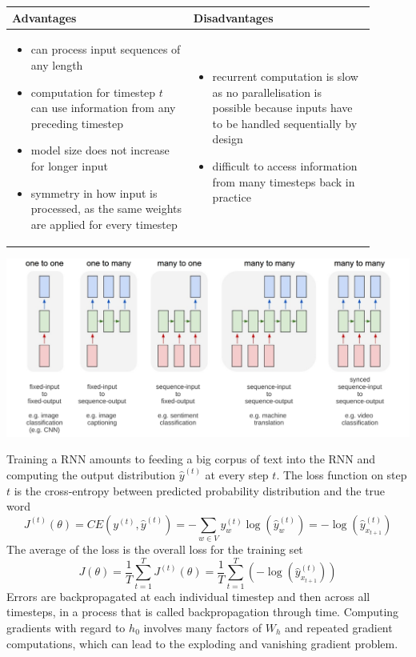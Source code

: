 \documentclass[11pt]{article}
\begin{document}
\begin{tabularx}{\linewidth}{p{0.45\linewidth} p{0.45\linewidth}}
	{\color{Green3} \textbf{Advantages}} & {\color{Firebrick3} \textbf{Disadvantages}} \\
	\hline
	\begin{itemize}[label={\color{Green3}\small+}, leftmargin=*]
		\item can process input sequences of any length
		\item computation for timestep $t$ can use information from any preceding timestep
		\item model size does not increase for longer input
		\item symmetry in how input is processed, as the same weights are applied for every timestep
	\end{itemize}
	&
	\begin{itemize}[label={\color{Firebrick3}-}, leftmargin=*]
		\item recurrent computation is slow as no parallelisation is possible because inputs have to be handled sequentially by design
		\item difficult to access information from many timesteps back in practice
	\end{itemize}
\end{tabularx}
\begin{center}
	\includegraphics[width=0.8\linewidth]{img/rnn_models}
\end{center}
Training a RNN amounts to feeding a big corpus of text into the RNN and computing the output distribution $\hat{y}^{(t)}$ at every step $t$. The loss function on step $t$ is the cross-entropy between predicted probability distribution and the true word
\begin{equation*}
	J^{(t)}(\theta) = CE(y^{(t)}, \hat{y}^{(t)}) = -\sum_{w\in V} y_w^{(t)} \log\left(\hat{y}_w^{(t)}\right) = -\log\left(\hat{y}_{x_{t+1}}^{(t)}\right)
\end{equation*}
The average of the loss is the overall loss for the training set
\begin{equation*}
	J(\theta) = \frac{1}{T}\sum_{t=1}^{T}J^{(t)} (\theta) = \frac{1}{T} \sum_{t=1}^{T}\left(-\log\left(\hat{y}_{x_{t+1}}^{(t)}\right)\right)
\end{equation*}
Errors are backpropagated at each individual timestep and then across all timesteps, in a process that is called backpropagation through time. Computing gradients with regard to $h_0$ involves many factors of $W_h$ and repeated gradient computations, which can lead to the exploding and vanishing gradient problem.
\end{document}
